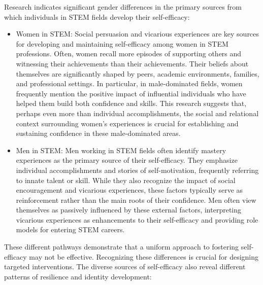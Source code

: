 Research indicates significant gender differences in the primary sources from which individuals in STEM fields develop their self-efficacy:
\begin{itemize}
    \item Women in STEM: Social persuasion and vicarious experiences are key sources for developing and maintaining self-efficacy among women in STEM professions. Often, women recall more episodes of supporting others and witnessing their achievements than their achievements. Their beliefs about themselves are significantly shaped by peers, academic environments, families, and professional settings. In particular, in male-dominated fields, women frequently mention the positive impact of influential individuals who have helped them build both confidence and skills. This research suggests that, perhaps even more than individual accomplishments, the social and relational context surrounding women's experiences is crucial for establishing and sustaining confidence in these male-dominated areas.
    \item Men in STEM: Men working in STEM fields often identify mastery experiences as the primary source of their self-efficacy. They emphasize individual accomplishments and stories of self-motivation, frequently referring to innate talent or skill. While they also recognize the impact of social encouragement and vicarious experiences, these factors typically serve as reinforcement rather than the main roots of their confidence. Men often view themselves as passively influenced by these external factors, interpreting vicarious experiences as enhancements to their self-efficacy and providing role models for entering STEM careers. 
\end{itemize}
These different pathways demonstrate that a uniform approach to fostering self-efficacy may not be effective. Recognizing these differences is crucial for designing targeted interventions.
The diverse sources of self-efficacy also reveal different patterns of resilience and identity development:
